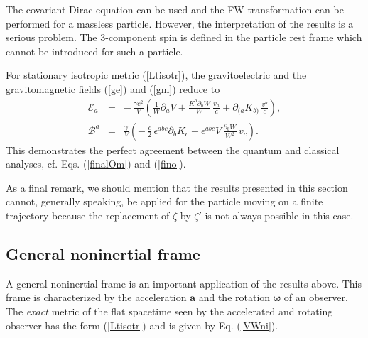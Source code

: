 \documentclass[preprint,showpacs,preprintnumbers,eqsecnum,amsmath,amssymb]{revtex4}
\begin{document}
The covariant Dirac equation can be used and the FW transformation
can be performed for a massless particle. However, the
interpretation of the results is a serious problem. The
3-component spin is defined in the particle rest frame which
cannot be introduced for such a particle.

For stationary isotropic metric (\ref{Ltisotr}), the gravitoelectric and 
the gravitomagnetic fields (\ref{ge}) and (\ref{gm}) reduce to
\begin{eqnarray}\label{ige}
{\mathcal E}_a &=& -\,{\frac {\gamma c^2}V}\left({\frac
1W}\partial_aV + {\frac {K^b\partial_bW}{W}}\,{\frac {v_a}{c}} +
\partial_{(a}K_{b)} \,{\frac {v^b}{c}}\right),\\ \label{igm}
{\mathcal B}^a &=& {\frac {\gamma}V}\left(-\,{\frac c2}\,\epsilon^{abc}
\partial_bK_c + \epsilon^{abc}V\,{\frac {\partial_bW}{W^2}}\,v_c\right).
\end{eqnarray}
This demonstrates the perfect agreement between the quantum and
classical analyses, cf. Eqs. (\ref{finalOm}) and (\ref{fino}).

As a final remark, we should mention that the results presented in
this section cannot, generally speaking, be applied for the particle moving 
on a finite trajectory because the replacement of $\zeta$ by $\zeta'$ is
not always possible in this case.  

\subsection{General noninertial frame}%

A general noninertial frame is an important application of the
results above. This frame is characterized by the acceleration
${\bm a}$ and the rotation ${\bm \omega}$ of an observer. The {\it exact} 
metric of the flat spacetime seen by the accelerated and rotating observer 
has the form (\ref{Ltisotr}) and is given by Eq. (\ref{VWni}).
\end{document}
